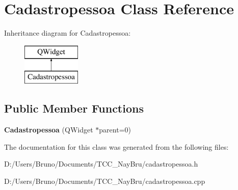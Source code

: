 \section{Cadastropessoa Class Reference}
\label{class_cadastropessoa}
Inheritance diagram for Cadastropessoa\+:\begin{figure}[H]
\begin{center}
\leavevmode
\includegraphics[height=2.000000cm]{class_cadastropessoa}
\end{center}
\end{figure}
\subsection*{Public Member Functions}
\begin{DoxyCompactItemize}
\item 
{\bfseries Cadastropessoa} (Q\+Widget $\ast$parent=0)\label{class_cadastropessoa_a706230f399727160a6fd25592f77da12}

\end{DoxyCompactItemize}


The documentation for this class was generated from the following files\+:\begin{DoxyCompactItemize}
\item 
D\+:/\+Users/\+Bruno/\+Documents/\+T\+C\+C\+\_\+\+Nay\+Bru/cadastropessoa.\+h\item 
D\+:/\+Users/\+Bruno/\+Documents/\+T\+C\+C\+\_\+\+Nay\+Bru/cadastropessoa.\+cpp\end{DoxyCompactItemize}
